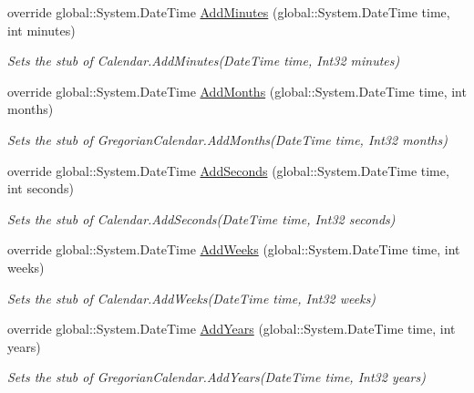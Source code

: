 \begin{DoxyCompactItemize}
override global\-::\-System.\-Date\-Time \hyperlink{class_system_1_1_globalization_1_1_fakes_1_1_stub_gregorian_calendar_a15fbe3b18c260bb1925df26db1acc2c3}{Add\-Minutes} (global\-::\-System.\-Date\-Time time, int minutes)
\begin{DoxyCompactList}\small\item\em Sets the stub of Calendar.\-Add\-Minutes(\-Date\-Time time, Int32 minutes)\end{DoxyCompactList}\item 
override global\-::\-System.\-Date\-Time \hyperlink{class_system_1_1_globalization_1_1_fakes_1_1_stub_gregorian_calendar_af7e23bc83a3a578506cc7e94399ebba1}{Add\-Months} (global\-::\-System.\-Date\-Time time, int months)
\begin{DoxyCompactList}\small\item\em Sets the stub of Gregorian\-Calendar.\-Add\-Months(\-Date\-Time time, Int32 months)\end{DoxyCompactList}\item 
override global\-::\-System.\-Date\-Time \hyperlink{class_system_1_1_globalization_1_1_fakes_1_1_stub_gregorian_calendar_a53ed086acb0f4a20c60d6bae679427e6}{Add\-Seconds} (global\-::\-System.\-Date\-Time time, int seconds)
\begin{DoxyCompactList}\small\item\em Sets the stub of Calendar.\-Add\-Seconds(\-Date\-Time time, Int32 seconds)\end{DoxyCompactList}\item 
override global\-::\-System.\-Date\-Time \hyperlink{class_system_1_1_globalization_1_1_fakes_1_1_stub_gregorian_calendar_a78f73b52d19bbe2688a2cc19d5447289}{Add\-Weeks} (global\-::\-System.\-Date\-Time time, int weeks)
\begin{DoxyCompactList}\small\item\em Sets the stub of Calendar.\-Add\-Weeks(\-Date\-Time time, Int32 weeks)\end{DoxyCompactList}\item 
override global\-::\-System.\-Date\-Time \hyperlink{class_system_1_1_globalization_1_1_fakes_1_1_stub_gregorian_calendar_a7e4f5b0c2efdbcb5b1d88605cdfa5eae}{Add\-Years} (global\-::\-System.\-Date\-Time time, int years)
\begin{DoxyCompactList}\small\item\em Sets the stub of Gregorian\-Calendar.\-Add\-Years(\-Date\-Time time, Int32 years)\end{DoxyCompactList}\item 

\end{DoxyCompactItemize}
